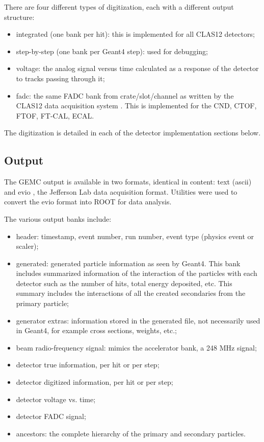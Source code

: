 There are four different types of digitization, each with a different output structure:

\begin{itemize}
	\item integrated (one bank per hit): this is implemented for all CLAS12 detectors;
	\item step-by-step (one bank per Geant4 step): used for debugging;
	\item voltage: the analog signal versus time calculated as a response of the detector to tracks passing through it;
	\item fadc: the same FADC bank from crate/slot/channel as written by the CLAS12 data acquisition system \cite{daq-nim}.
          This is implemented for the CND, CTOF, FTOF, FT-CAL, ECAL.
\end{itemize}


The digitization is detailed in each of the detector implementation sections below.


\subsection{Output}

The GEMC output is available in two formats, identical in content: text (ascii) and evio \cite{evio}, the Jefferson Lab
data acquisition format.
Utilities were used to convert the evio format into ROOT \cite{root} for data analysis.

The various output banks include:

\begin{itemize}
	\item header: timestamp, event number, run number, event type (physics event or scaler);
	\item generated: generated particle information as seen by Geant4. This bank includes summarized information of the interaction of
                     the particles with each detector such as the number of hits, total energy deposited, etc. This summary includes
                     the interactions of all the created secondaries from the primary particle;
	\item generator extras: information stored in the generated file, not necessarily used in Geant4, for example cross sections, weights, etc.;
	\item beam radio-frequency signal: mimics the accelerator bank, a 248 MHz signal;
	\item detector true information, per hit or per step;
	\item detector digitized information, per hit or per step;
	\item detector voltage vs. time;
	\item detector FADC signal;
	\item ancestors: the complete hierarchy of the primary and secondary particles.
\end{itemize}

